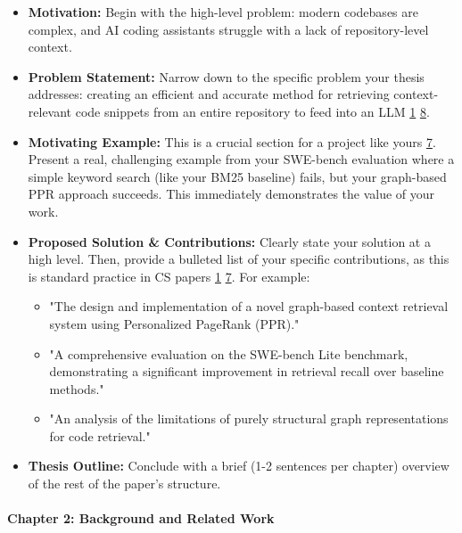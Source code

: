 \documentclass{article}
\begin{document}
\begin{itemize}
\item \textbf{Motivation:} Begin with the high-level problem: modern codebases are complex, and AI coding assistants struggle with a lack of repository-level context.


\item \textbf{Problem Statement:} Narrow down to the specific problem your thesis addresses: creating an efficient and accurate method for retrieving context-relevant code snippets from an entire repository to feed into an LLM \hyperref[ref:1]{1} \hyperref[ref:8]{8}.


\item \textbf{Motivating Example:} This is a crucial section for a project like yours \hyperref[ref:7]{7}. Present a real, challenging example from your SWE-bench evaluation where a simple keyword search (like your BM25 baseline) fails, but your graph-based PPR approach succeeds. This immediately demonstrates the value of your work.


\item \textbf{Proposed Solution \& Contributions:} Clearly state your solution at a high level. Then, provide a bulleted list of your specific contributions, as this is standard practice in CS papers \hyperref[ref:1]{1} \hyperref[ref:7]{7}. For example:

\begin{itemize}
\item "The design and implementation of a novel graph-based context retrieval system using Personalized PageRank (PPR)."


\item "A comprehensive evaluation on the SWE-bench Lite benchmark, demonstrating a significant improvement in retrieval recall over baseline methods."


\item "An analysis of the limitations of purely structural graph representations for code retrieval."


\end{itemize}


\item \textbf{Thesis Outline:} Conclude with a brief (1-2 sentences per chapter) overview of the rest of the paper's structure.


\end{itemize}

\paragraph{\textbf{Chapter 2: Background and Related Work}}
\end{document}
